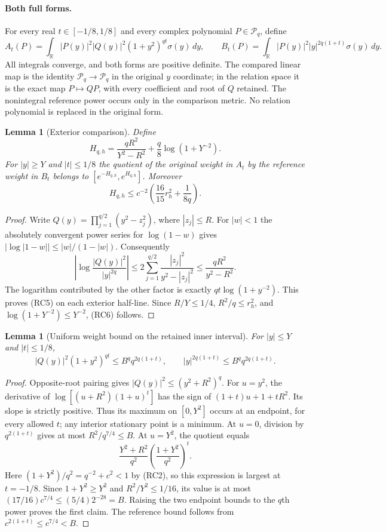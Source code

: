 \documentclass[11pt,a4paper]{article}
\newtheorem{lemma}[theorem]{Lemma}
\begin{document}
\paragraph{Both full forms.}
For every real $t\in[-1/8,1/8]$ and every complex polynomial
$P\in\mathcal P_q$, define
\[
 A_t(P)=\int_{\mathbb R}|P(y)|^2|Q(y)|^2
                    (1+y^2)^{qt}\sigma(y)\,dy,\qquad
 B_t(P)=\int_{\mathbb R}|P(y)|^2|y|^{2q(1+t)}
                    \sigma(y)\,dy.               \tag{RC4}
\]
All integrals converge, and both forms are positive definite.
The compared linear map is the identity
$\mathcal P_q\longrightarrow\mathcal P_q$ in the original $y$ coordinate;
in the relation space it is the exact map
$P\mapsto QP$, with every coefficient and root of $Q$ retained.
The nonintegral reference power occurs only in the comparison metric.
No relation polynomial is replaced in the original form.

\begin{lemma}[Exterior comparison]
Define
\[
 H_{q,h}=\frac{qR^2}{Y^2-R^2}
                 +\frac q8\log(1+Y^{-2}).         \tag{RC5}
\]
For $|y|\geq Y$ and $|t|\leq1/8$ the quotient of the original weight
in $A_t$ by the reference weight in $B_t$ belongs to
$[e^{-H_{q,h}},e^{H_{q,h}}]$.
Moreover
\[
 H_{q,h}\leq
 c^{-2}\left(\frac{16}{15}r_h^2+\frac1{8q}\right).
 \tag{RC6}
\]
\end{lemma}
\begin{proof}
Write $Q(y)=\prod_{j=1}^{q/2}(y^2-z_j^2)$, where
$|z_j|\leq R$. For $|w|<1$ the absolutely convergent power series for
$\log(1-w)$ gives
$|\log|1-w||\leq |w|/(1-|w|)$.
Consequently
\[
 \left|\log\frac{|Q(y)|^2}{|y|^{2q}}\right|
 \leq 2\sum_{j=1}^{q/2}
       \frac{|z_j|^2}{y^2-|z_j|^2}
 \leq\frac{qR^2}{y^2-R^2}.
\]
The logarithm contributed by the other factor is exactly
$qt\log(1+y^{-2})$.
This proves (RC5) on each exterior half-line.
Since $R/Y\leq1/4$, $R^2/q\leq r_h^2$, and
$\log(1+Y^{-2})\leq Y^{-2}$, (RC6) follows.
\end{proof}

\begin{lemma}[Uniform weight bound on the retained inner interval]
For $|y|\leq Y$ and $|t|\leq1/8$,
\[
 |Q(y)|^2(1+y^2)^{qt}
       \leq B^q q^{2q(1+t)},\qquad
 |y|^{2q(1+t)}
       \leq B^q q^{2q(1+t)}.                     \tag{RC7}
\]
\end{lemma}
\begin{proof}
Opposite-root pairing gives $|Q(y)|^2\leq(y^2+R^2)^q$.
For $u=y^2$, the derivative of
$\log[(u+R^2)(1+u)^t]$ has the sign of
$(1+t)u+1+tR^2$. Its slope is strictly positive.
Thus its maximum on $[0,Y^2]$ occurs at an endpoint, for every allowed
$t$; any interior stationary point is a minimum.
At $u=0$, division by $q^{2(1+t)}$ gives at most
$R^2/q^{7/4}\leq B$.
At $u=Y^2$, the quotient equals
\[
 \frac{Y^2+R^2}{q^2}
              \left(\frac{1+Y^2}{q^2}\right)^t .
\]
Here $(1+Y^2)/q^2=q^{-2}+c^2<1$ by (RC2), so this expression is largest
at $t=-1/8$. Since $1+Y^2\geq Y^2$ and $R^2/Y^2\leq1/16$, its value is
at most $(17/16)c^{7/4}\leq(5/4)2^{-28}=B$.
Raising the two endpoint bounds to the $q$th power proves the first
claim. The reference bound follows from
$c^{2(1+t)}\leq c^{7/4}<B$.
\end{proof}
\end{document}
